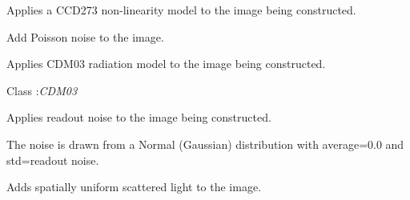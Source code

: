 \documentclass[a4paper,11pt,english]{sphinxmanual}
\begin{document}
\begin{fulllineitems}
\begin{fulllineitems}
\end{fulllineitems}


\begin{fulllineitems}
\label{simulator:simulator.simulator.VISsimulator.applyNonlinearity}
Applies a CCD273 non-linearity model to the image being constructed.

\end{fulllineitems}


\begin{fulllineitems}
\label{simulator:simulator.simulator.VISsimulator.applyPoissonNoise}
Add Poisson noise to the image.

\end{fulllineitems}


\begin{fulllineitems}
\label{simulator:simulator.simulator.VISsimulator.applyRadiationDamage}
Applies CDM03 radiation model to the image being constructed.




Class :\emph{CDM03}



\end{fulllineitems}


\begin{fulllineitems}
\label{simulator:simulator.simulator.VISsimulator.applyReadoutNoise}
Applies readout noise to the image being constructed.

The noise is drawn from a Normal (Gaussian) distribution with average=0.0 and std=readout noise.

\end{fulllineitems}


\begin{fulllineitems}
\label{simulator:simulator.simulator.VISsimulator.applyScatteredLight}
Adds spatially uniform scattered light to the image.


\end{fulllineitems}
\end{fulllineitems}
\end{document}
